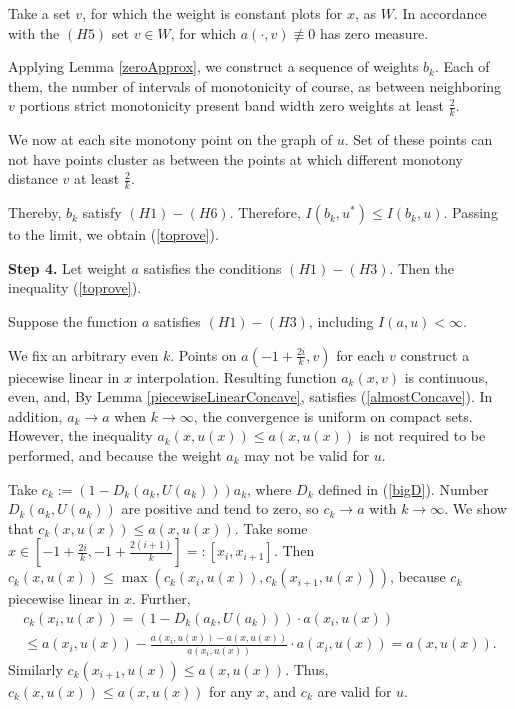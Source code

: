 Take a set $v$, for which the weight is constant plots for $x$,
as $W$.
In accordance with the $(H5)$ set $v \in W$, for which $a(\cdot, v) \not\equiv 0$
has zero measure.

Applying Lemma \ref{zeroApprox}, we construct a sequence of weights $b_k$.
Each of them, the number of intervals of monotonicity of course,
as between neighboring $v$ portions strict monotonicity
present band width zero weights at least $\frac{2}{k}$.

We now at each site monotony point on the graph of $u$.
Set of these points can not have points cluster
as between the points at which different monotony
distance $v$ at least $\frac{2}{k}$.

Thereby, $b_k$ satisfy $(H1)-(H6)$. Therefore, $I(b_k, u^*) \le I(b_k, u)$.
Passing to the limit, we obtain (\ref{toprove}).

\bigskip
{\bf Step 4.} Let weight $a$ satisfies the conditions $(H1)-(H3)$.
Then the inequality (\ref{toprove}).

Suppose the function $a$ satisfies $(H1)-(H3)$, including $I(a, u) < \infty$.

We fix an arbitrary even $k$.
Points on $a(-1 + \frac{2i}{k}, v)$ for each $v$ construct a piecewise linear in $x$ interpolation.
Resulting function $a_k(x, v)$ is continuous, even, and,
By Lemma \ref{piecewiseLinearConcave}, satisfies
(\ref{almostConcave}).
In addition, $a_k \to a$ when $k \to \infty$,
the convergence is uniform on compact sets.
However, the inequality $a_k(x, u(x)) \le a(x, u(x))$ is not required to be performed,
and because the weight $a_k$ may not be valid for $u$.

Take $c_k := (1 - D_k(a_k, U(a_k))) a_k$, where $D_k$ defined in (\ref{bigD}).
Number $D_k(a_k, U(a_k))$ are positive and tend to zero, so $c_k \to a$ with $k \to \infty$.
We show that $c_k(x, u(x)) \le a(x, u(x))$.
Take some
$x \in [-1 + \frac{2i}{k}, -1 + \frac{2(i + 1)}{k}] =: [x_i, x_{i + 1}]$.
Then $c_k(x, u(x)) \le \max( c_k(x_i, u(x)), c_k(x_{i + 1}, u(x)) )$, because
$c_k$ piecewise linear in $x$. Further,
\begin{multline*}
c_k (x_i, u (x)) = ( 1 - D_k (a_k, U (a_k))) \cdot a (x_i, u (x)) \\
\le a (x_i, u (x)) - \frac{a (x_i, u (x)) - a (x, u (x))}{a (x_i, u (x))} \cdot a ( x_i, u (x)) = a (x, u (x)).
\end{multline*}
Similarly $c_k(x_{i + 1}, u(x)) \le a(x, u(x))$.
Thus, $c_k(x, u(x)) \le a(x, u(x))$ for any $x$, and $c_k$ are valid for $u$.

